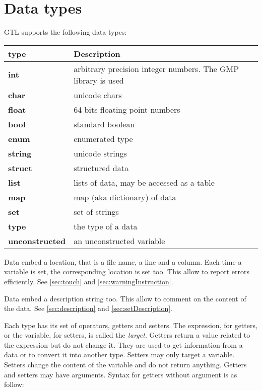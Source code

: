 \documentclass[10pt,openright,twosides]{report}
\begin{document}
\chapter{Data types}

GTL supports the following data types:
\begin{longtable}{>{\bfseries\ttfamily\small}l|l}
{\bf type}&{\bf Description}\\
\hline\endhead
 {int}&
  {arbitrary precision integer numbers. The GMP library is used}\\
 {char}&
  {unicode chars}\\
 {float}&
  {64 bits floating point numbers}\\
 {bool}&
  {standard boolean}\\
 {enum}&
  {enumerated type}\\
 {string}&
  {unicode strings}\\
 {struct}&
  {structured data}\\
 {list}&
  {lists of data, may be accessed as a table}\\
 {map}&
  {map (aka dictionary) of data}\\
 {set}&
  {set of strings}\\
 {type}&
  {the type of a data}\\
 {unconstructed}&
  {an unconstructed variable}
\end{longtable}

Data embed a location, that is a file name, a line and a column. Each time a variable is set, the corresponding location is set too. This allow to report errors efficiently. See \ref{sec:touch} and \ref{sec:warningInstruction}.

Data embed a description string too. This allow to comment on the content of the data. See \ref{sec:description} and \ref{sec:setDescription}.

Each type has its set of operators, getters and setters. The expression, for getters, or the variable, for setters, is called the {\em target}. Getters return a value related to the expression but do not change it. They are used to get information from a data or to convert it into another type.  Setters may only target a variable. Setters change the content of the variable and do not return anything. Getters and setters may have arguments. Syntax for getters without argument is as follow:

\begin{gtl}
\end{gtl}
\end{document}
